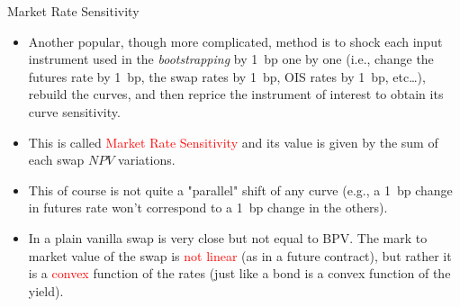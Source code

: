 \documentclass{beamer}
\begin{document}
%
%
%
%
%
%

\begin{frame}{Market Rate Sensitivity}
	\begin{itemize}
		\item<1-> Another popular, though more complicated, method is to shock each input instrument used in the \emph{bootstrapping} by 1~bp one by one (i.e., change the futures rate by 1~bp, the swap rates by 1~bp, OIS rates by 1~bp, etc\ldots), rebuild the curves, and then reprice the instrument of interest to obtain its curve sensitivity. 
		\item<2-> This is called \textcolor{red}{Market Rate Sensitivity} and its value is given by the sum of each swap $NPV$ variations.
		\item<3-> This of course is not quite a "parallel" shift of any curve (e.g., a 1~bp change in futures rate won't correspond to a 1~bp change in the others).
		\item<4-> In a plain vanilla swap is very close but not equal to BPV. The mark to market value of the swap is \textcolor{red}{not linear} (as in a future contract), but rather it is a \textcolor{red}{convex} function of the rates (just like a bond is a convex function of the yield).
	\end{itemize}
\end{frame}
\end{document}
